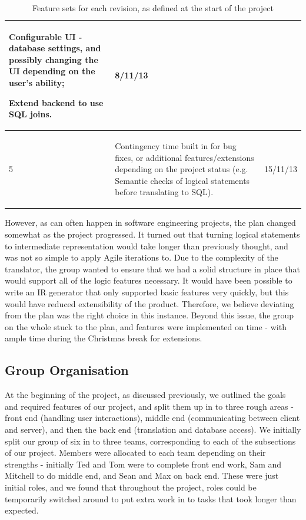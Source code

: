 \documentclass[a4paper, 11pt]{article}
\begin{document}
\begin{table}[H]
\begin{tabular}{| l | p{} | l |}
\begin{compactitem}
            \item Configurable UI - database settings, and possibly changing the
              UI depending on the user's ability;
            \item Extend backend to use SQL joins.
          \end{compactitem}
          & 8/11/13 \\
        \hline
        5 &
          \begin{compactitem}
            \item Contingency time built in for bug fixes, or additional
              features/extensions depending on the project status (e.g. Semantic
              checks of logical statements before translating to SQL).
          \end{compactitem}
          & 15/11/13 \\
        \hline
      \end{tabular}
      \caption{Feature sets for each revision, as defined at the start of the
        project}
    \end{table}

    However, as can often happen in software engineering projects, the plan
    changed somewhat as the project progressed. It turned out that turning
    logical statements to intermediate representation would take longer than
    previously thought, and was not so simple to apply Agile iterations to. Due
    to the complexity of the translator, the group wanted to ensure that we
    had a solid structure in place that would support all of the logic features
    necessary. It would have been possible to write an IR generator that only
    supported basic features very quickly, but this would have reduced
    extensibility of the product. Therefore, we believe deviating from the plan
    was the right choice in this instance. Beyond this issue, the group on the
    whole stuck to the plan, and features were implemented on time - with ample
    time during the Christmas break for extensions.

  \subsection{Group Organisation}
    At the beginning of the project, as discussed previously, we outlined the
    goals and required features of our project, and split them up in to three
    rough areas - front end (handling user interactions),
    middle end (communicating between client and server), and
    then the back end (translation and database access).
    We initially split our group of six in to three teams,
    corresponding to each of the subsections of our project. Members were
    allocated to each team depending on their strengths - initially Ted and Tom
    were to complete front end work, Sam and Mitchell to do middle end, and
    Sean and Max on back end. These were just initial roles, and we found that
    throughout the project, roles could be temporarily switched around to put
    extra work in to tasks that took longer than expected.
\end{document}

